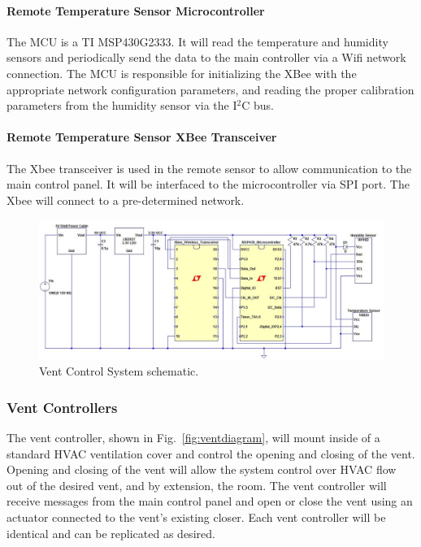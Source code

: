 \paragraph{Remote Temperature Sensor Microcontroller}
The MCU is a TI MSP430G2333.  It will read the temperature and humidity sensors and periodically send the data to the main controller via a Wifi network connection.  The MCU is responsible for initializing the XBee with the appropriate network configuration parameters, and reading the proper calibration parameters from the humidity sensor via the I$^2$C bus.
\paragraph{Remote Temperature Sensor XBee Transceiver}
The Xbee transceiver is used in the remote sensor to allow communication to the main control panel. It will be interfaced to the microcontroller via SPI port.  The Xbee will connect to a pre-determined network.

\begin{figure}[htbp]
\centering
\includegraphics[width=.99\textwidth]{Vent_System.JPG}
\caption{Vent Control System schematic.}
\label{fig:Vent_System}
\end{figure}

\subsubsection{Vent Controllers}
The vent controller, shown in Fig.~\ref{fig:ventdiagram}, will mount inside of a standard HVAC ventilation cover and control the opening and closing of the vent.  Opening and closing of the vent will allow the system control over HVAC flow out of the desired vent, and by extension, the room. The vent controller will receive messages from the main control panel and open or close the vent using an actuator connected to the vent's existing closer. Each vent controller will be identical and can be replicated as desired.
